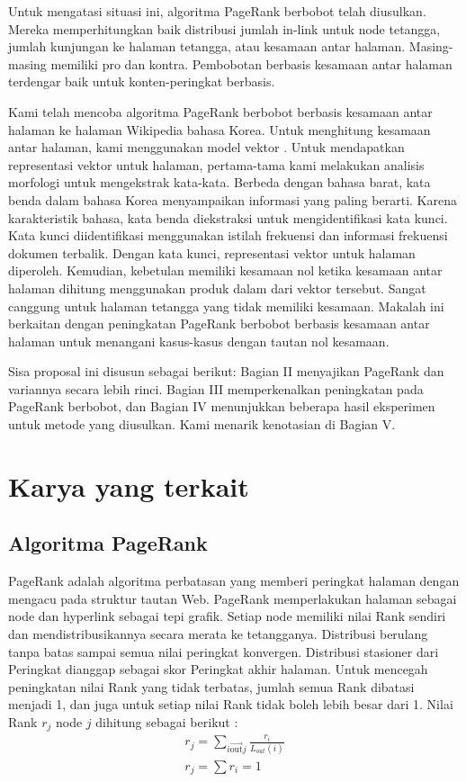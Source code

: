 \documentclass[conference]{IEEEtran}
\begin{document}
Untuk mengatasi situasi ini, algoritma PageRank berbobot \cite{xing2004weighted, qiao2010simrank,kumar2013pagerank} telah diusulkan. Mereka memperhitungkan baik distribusi jumlah in-link untuk node tetangga, jumlah kunjungan ke halaman tetangga, atau kesamaan antar halaman. Masing-masing memiliki pro dan kontra. Pembobotan berbasis kesamaan antar halaman terdengar baik untuk konten-peringkat berbasis.

Kami telah mencoba algoritma PageRank berbobot berbasis kesamaan antar halaman ke halaman Wikipedia bahasa Korea. Untuk menghitung kesamaan antar halaman, kami menggunakan model vektor \cite{}. Untuk mendapatkan representasi vektor untuk halaman, pertama-tama kami melakukan analisis morfologi untuk mengekstrak kata-kata. Berbeda dengan bahasa barat, kata benda dalam bahasa Korea menyampaikan informasi yang paling berarti. Karena karakteristik bahasa, kata benda diekstraksi untuk mengidentifikasi kata kunci. Kata kunci diidentifikasi menggunakan istilah frekuensi dan informasi frekuensi dokumen terbalik. Dengan kata kunci, representasi vektor untuk halaman diperoleh. Kemudian, kebetulan memiliki kesamaan nol ketika kesamaan antar halaman dihitung menggunakan produk dalam dari vektor tersebut. Sangat canggung untuk halaman tetangga yang tidak memiliki kesamaan. Makalah ini berkaitan dengan peningkatan PageRank berbobot berbasis kesamaan antar halaman untuk menangani kasus-kasus dengan tautan nol kesamaan.

Sisa proposal ini disusun sebagai berikut: Bagian II menyajikan PageRank dan variannya secara lebih rinci. Bagian III memperkenalkan peningkatan pada PageRank berbobot, dan Bagian IV menunjukkan beberapa hasil eksperimen untuk metode yang diusulkan. Kami menarik kenotasian di Bagian V.

\section{Karya yang terkait}

\subsection{Algoritma PageRank}

PageRank \cite{brin1998anatomy} adalah algoritma perbatasan yang memberi peringkat halaman dengan mengacu pada struktur tautan Web. PageRank memperlakukan halaman sebagai node dan hyperlink sebagai tepi grafik. Setiap node memiliki nilai Rank sendiri dan mendistribusikannya secara merata ke tetangganya. Distribusi berulang tanpa batas sampai semua nilai peringkat konvergen. Distribusi stasioner dari Peringkat dianggap sebagai skor Peringkat akhir halaman. Untuk mencegah peningkatan nilai Rank yang tidak terbatas, jumlah semua Rank dibatasi menjadi 1, dan juga untuk setiap nilai Rank tidak boleh lebih besar dari 1. Nilai Rank \(r_{j}\) node \(j\) dihitung sebagai berikut :
\begin{eqnarray}
    r_{j} = \sum_{i\overrightarrow{\text {out}} j}{\frac {r_{i}} {L_{out}(i)}}\\
    r_{j} = \sum r_{ i } = 1
\end{eqnarray}
\end{document}
